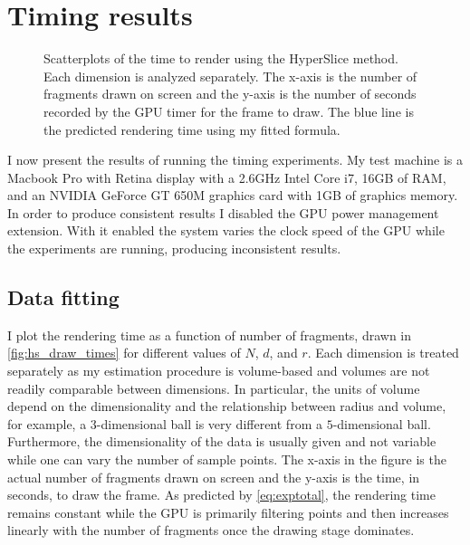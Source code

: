 
\section{Timing results}
\label{sec:timingresults}

\begin{figure}[t]
  \centering
  
  \caption[Scatterplots of the time to render using the HyperSlice method.]{%
    Scatterplots of the time to render using the HyperSlice method.
    Each dimension is analyzed separately.  The x-axis is the number of
    fragments drawn on screen and the y-axis is the number of seconds
    recorded by the GPU timer for the frame to draw.
    The blue line is the predicted rendering time using my fitted 
    formula. 
  }
  \label{fig:hs_draw_times}
\end{figure}

I now present the results of running the timing experiments.  My test
machine is a Macbook Pro with Retina display with a 2.6GHz Intel Core i7, 16GB
of RAM, and an NVIDIA GeForce GT 650M graphics card with 1GB of graphics
memory.  In order to produce consistent results I disabled the GPU power
management extension.  With it enabled the system varies the clock speed of
the GPU while the experiments are running, producing inconsistent results.

\subsection{Data fitting}
\label{sec:datafitting}

I plot the rendering time as a function of number of fragments,
drawn in \autoref{fig:hs_draw_times} for different values of $N$, $d$, and $r$. 
Each dimension is treated separately as my estimation procedure is volume-based
and volumes are not readily comparable between dimensions.  
In particular, the units of volume depend on the dimensionality and the 
relationship between radius and volume,
for example, a $3$-dimensional ball is very different from a
$5$-dimensional ball.
Furthermore, the dimensionality of the data is usually given and not 
variable while one can vary the number of sample points.
The x-axis in the figure is
the actual number of fragments drawn on screen and the y-axis is the 
time, in seconds, to draw the frame.  As predicted by \autoref{eq:exptotal},
the rendering time remains constant while the GPU is primarily filtering 
points and then increases linearly with the number of fragments once the 
drawing stage dominates.


